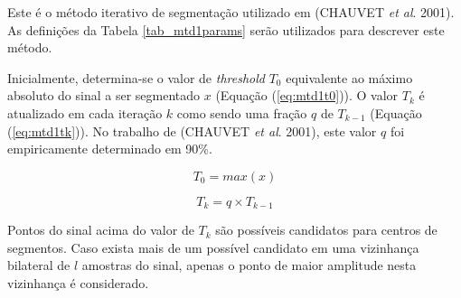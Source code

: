 Este é o método iterativo de segmentação utilizado em (CHAUVET \emph{et al}. 2001). As definições da Tabela \ref{tab_mtd1params} serão utilizados para descrever este método.
\begin{table}[htb]
\end{table}

Inicialmente, determina-se o valor de \emph{threshold} $T_0$ equivalente ao máximo absoluto do sinal a ser segmentado $x$ (Equação (\ref{eq:mtd1t0})). O valor $T_k$ é atualizado em cada iteração $k$ como sendo uma fração $q$ de $T_{k-1}$ (Equação (\ref{eq:mtd1tk})). No trabalho de (CHAUVET \emph{et al}. 2001), este valor $q$ foi empiricamente determinado em 90\%.

\begin{equation}
\label{eq:mtd1t0}
  T_0 = max(x)
\end{equation}

\begin{equation}
\label{eq:mtd1tk}
  T_k = q \times T_{k-1}
\end{equation}

Pontos do sinal acima do valor de $T_k$ são possíveis candidatos para centros de segmentos. Caso exista mais de um possível candidato em uma vizinhança bilateral de $l$ amostras do sinal, apenas o ponto de maior amplitude nesta vizinhança é considerado.

